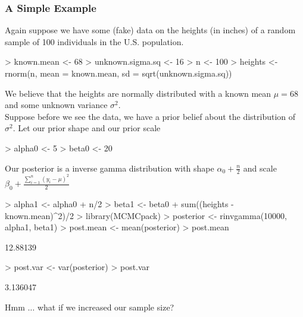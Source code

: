 \documentclass{beamer}
\begin{document}
\begin{frame}[fragile]
\frametitle{A Simple Example}
\pause
Again suppose we have some (fake) data on the heights (in inches) of a
random sample of 100 individuals in the U.S. population.
\pause
\medskip
\tiny
\begin{Schunk}
\begin{Sinput}
> known.mean <- 68
> unknown.sigma.sq <- 16
> n <- 100
> heights <- rnorm(n, mean = known.mean, sd = sqrt(unknown.sigma.sq))
\end{Sinput}
\end{Schunk}
\normalsize
\pause
\bigskip
 We believe that the heights are normally distributed with a known
mean $\mu = 68$ and some unknown variance $\sigma^2$.\\
\bigskip
\pause
Suppose before we see the data, we have a prior belief about the
distribution of $\sigma^2$.  Let our prior shape  and
our prior scale 
\medskip
\pause
\tiny
\begin{Schunk}
\begin{Sinput}
> alpha0 <- 5
> beta0 <- 20
\end{Sinput}
\end{Schunk}
\end{frame}

\begin{frame}[fragile]
Our posterior is a inverse gamma distribution with shape $\alpha_0 +
\frac{n}{2}$ and scale $\beta_0 + \frac{\sum_{i=1}^n (y_i-\mu)^2}{2}$
\medskip
\pause
\tiny
\begin{Schunk}
\begin{Sinput}
> alpha1 <- alpha0 + n/2
> beta1 <- beta0 + sum((heights - known.mean)^2)/2
> library(MCMCpack)
> posterior <- rinvgamma(10000, alpha1, beta1)
> post.mean <- mean(posterior)
> post.mean
\end{Sinput}
\begin{Soutput}
[1] 12.88139
\end{Soutput}
\begin{Sinput}
> post.var <- var(posterior)
> post.var
\end{Sinput}
\begin{Soutput}
[1] 3.136047
\end{Soutput}
\end{Schunk}
\normalsize
\pause
Hmm $\dots$ what if we increased our sample size?
\end{frame}
\end{document}
